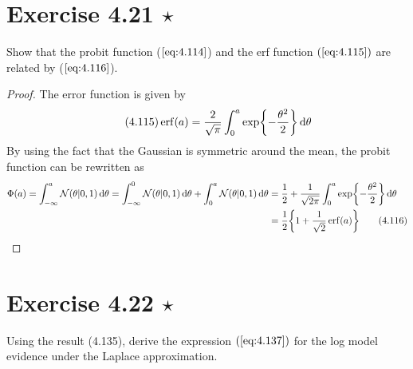\section*{Exercise 4.21 $\star$}
Show that the probit function ($\ref{eq:4.114}$) and the erf function $(\ref{eq:4.115})$ are
related by ($\ref{eq:4.116}$).

\vspace{1em}

\begin{proof}
    The error function is given by
    \begin{equation}\label{eq:4.115}\tag{4.115}
        \erf(a) = \frac{2}{\sqrt{\pi}} \int_{0}^{a} \exp{-\frac{\theta^2}{2}} \diff \theta
    \end{equation}
    By using the fact that the Gaussian is symmetric around the mean, 
    the probit function can be rewritten as
    \begin{align*}
        \Phi(a) 
        = \int_{-\infty}^{a} \mathcal{N}(\theta | 0, 1) \diff \theta
        = \int_{-\infty}^{0} \mathcal{N}(\theta | 0, 1) \diff \theta
        + \int_{0}^{a} \mathcal{N}(\theta | 0, 1) \diff \theta
        &= \frac{1}{2} + \frac{1}{\sqrt{2\pi}} \int_{0}^{a} \exp{-\frac{\theta^2}{2}} \diff \theta \\
        &= \frac{1}{2} \bigg\{1 + \frac{1}{\sqrt{2}} \erf(a)\bigg\} \label{eq:4.116}\tag{4.116}
    \end{align*}
\end{proof}

\section*{Exercise 4.22 $\star$}
Using the result (4.135), derive the expression
$(\ref{eq:4.137})$ for the log model evidence under the Laplace
approximation.

\vspace{1em}

